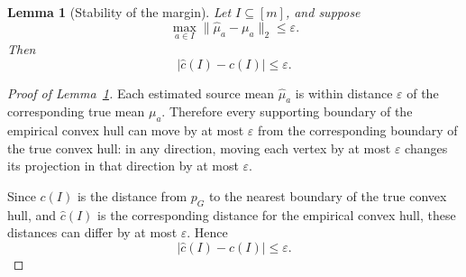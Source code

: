 \documentclass[twoside]{article}
\newtheorem{lemma}{Lemma}
\begin{document}
\begin{lemma}[Stability of the margin]
\label{lem:margin-stability}
Let \(I\subseteq[m]\), and suppose
\[
\max_{a\in I}
\|\widehat\mu_a-\mu_a\|_2
\leq
\varepsilon.
\]
Then
\[
\bigl|
\widehat c(I)-c(I)
\bigr|
\leq
\varepsilon.
\]
\end{lemma}

\begin{proof}[Proof of Lemma~\ref{lem:margin-stability}]
Each estimated source mean \(\widehat\mu_a\) is within distance
\(\varepsilon\) of the corresponding true mean \(\mu_a\). Therefore every
supporting boundary of the empirical convex hull can move by at most
\(\varepsilon\) from the corresponding boundary of the true convex hull:
in any direction, moving each vertex by at most \(\varepsilon\) changes its
projection in that direction by at most \(\varepsilon\).

Since \(c(I)\) is the distance from \(p_G\) to the nearest boundary of the
true convex hull, and \(\widehat c(I)\) is the corresponding distance for the
empirical convex hull, these distances can differ by at most
\(\varepsilon\). Hence
\[
|\widehat c(I)-c(I)|
\leq
\varepsilon.
\]
\end{proof}



\end{document}
